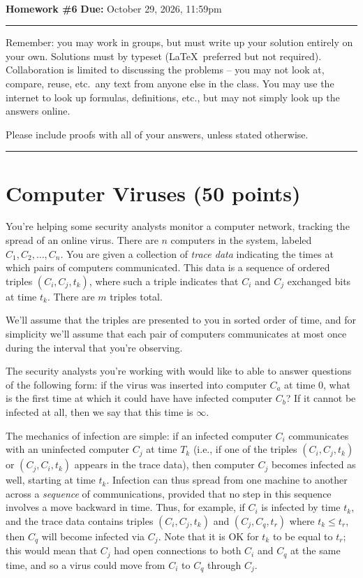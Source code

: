 \documentclass[11pt]{article}
\begin{document}
\\ 
{{\bf Homework \#6}} \hfill {{\bf Due:} October 29, 2026, 11:59pm} \\
\rule[0.1in]{\textwidth}{0.4pt}

Remember: you may work in groups, but must write up your solution entirely on your own.  Solutions must by typeset (\LaTeX\ preferred but not required). 
Collaboration is limited to discussing the problems -- you may not look at, compare, reuse, etc.~any text from anyone else in the class. 
You may use the internet to look up formulas, definitions, etc., but may not simply look up the answers online.  

Please include proofs with all of your answers, unless stated otherwise.

\noindent \rule[0.1in]{\textwidth}{0.4pt}

\section{Computer Viruses (50 points)}
You're helping some security analysts monitor a computer network, tracking the spread of an online virus. There are $n$ computers in the system, 
labeled $C_1, C_2, \dots, C_n$. You are given a collection of \emph{trace data} indicating the times at which pairs of computers communicated. 
This data is a sequence of ordered triples $(C_i, C_j, t_k)$, where such a triple indicates that $C_i$ and $C_j$ exchanged bits at time $t_k$. 
There are $m$ triples total.

We'll assume that the triples are presented to you in sorted order of time, and for simplicity we'll assume that each pair of computers communicates 
at most once during the interval that you're observing.

The security analysts you're working with would like to able to answer questions of the following form: if the virus was inserted into computer $C_a$ 
at time $0$, what is the first time at which it could have have infected computer $C_b$? If it cannot be infected at all, 
then we say that this time is $\infty$.

The mechanics of infection are simple: if an infected computer $C_i$ communicates with an uninfected computer $C_j$ at time $T_k$ 
(i.e., if one of the triples $(C_i, C_j, t_k)$ or $(C_j, C_i, t_k)$ appears in the trace data), then computer $C_j$ becomes infected as well, 
starting at time $t_k$. Infection can thus spread from one machine to another across a \emph{sequence} of communications, 
provided that no step in this sequence involves a move backward in time. Thus, for example, if $C_i$ is infected by time $t_k$,
and the trace data contains triples $(C_i, C_j, t_k)$ and $(C_j, C_q, t_r)$ where $t_k \leq t_r$, then $C_q$ will become infected via $C_j$. 
Note that it is OK for $t_k$ to be equal to $t_r$; this would mean that $C_j$ had open connections to both $C_i$ and $C_q$ at the same time, 
and so a virus could move from $C_i$ to $C_q$ through $C_j$.
\end{document}
